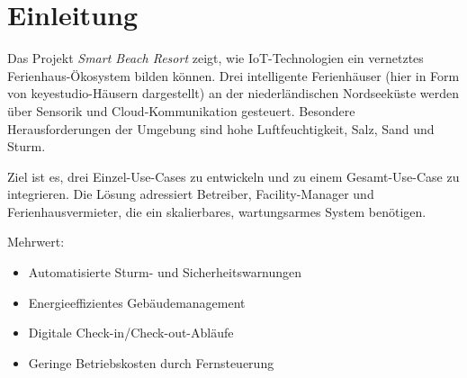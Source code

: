 \section{Einleitung}
Das Projekt \textit{Smart Beach Resort} zeigt, wie IoT-Technologien ein vernetztes Ferienhaus-Ökosystem bilden können.
Drei intelligente Ferienhäuser (hier in Form von keyestudio-Häusern dargestellt) an der niederländischen Nordseeküste werden über Sensorik und Cloud-Kommunikation gesteuert.
Besondere Herausforderungen der Umgebung sind hohe Luftfeuchtigkeit, Salz, Sand und Sturm.

Ziel ist es, drei Einzel-Use-Cases zu entwickeln und zu einem Gesamt-Use-Case zu integrieren.
Die Lösung adressiert Betreiber, Facility-Manager und Ferienhausvermieter, die ein skalierbares, wartungsarmes System benötigen.

Mehrwert:
\begin{itemize}[noitemsep]
	\item Automatisierte Sturm- und Sicherheitswarnungen
	\item Energieeffizientes Gebäudemanagement
	\item Digitale Check-in/Check-out-Abläufe
	\item Geringe Betriebskosten durch Fernsteuerung
\end{itemize}